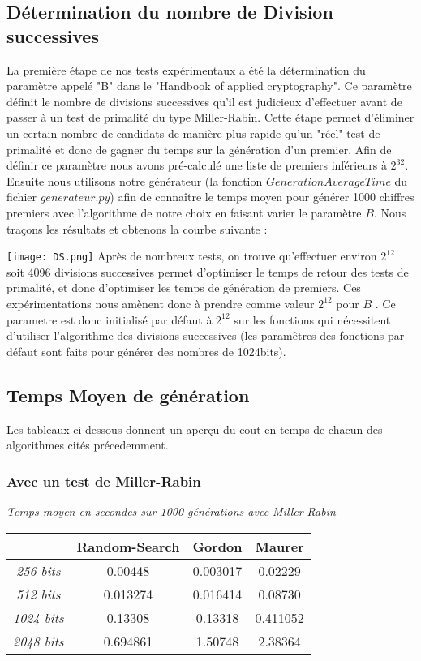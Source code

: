 \documentclass[a4paper,11pt]{article}
\begin{document}
\subsection{Détermination du nombre de Division successives}
La première étape de nos tests expérimentaux a été la détermination du paramètre appelé "B" dans le "Handbook of applied cryptography". Ce paramètre définit le nombre de divisions successives qu'il est judicieux d'effectuer avant de passer à un test de primalité du type Miller-Rabin. Cette étape permet d'éliminer un certain nombre de candidats de manière plus rapide qu'un "réel" test de primalité et donc de gagner du temps sur la génération d'un premier. 
\newline
Afin de définir ce paramètre nous avons pré-calculé une liste de premiers inférieurs à $2^{32}$. Ensuite nous utilisons notre  générateur (la fonction $GenerationAverageTime$ du fichier $generateur.py$) afin de connaître le temps moyen pour générer 1000 chiffres premiers avec l'algorithme de notre choix en  faisant varier le paramètre $B$. Nous traçons les résultats et obtenons la courbe suivante : 


{\centering
\texttt{[image: DS.png]}
}
Après de nombreux tests, on trouve qu'effectuer environ $2^{12}$ soit 4096 divisions successives permet d'optimiser le temps de retour des tests de primalité, et donc d'optimiser les temps de génération de premiers.
Ces expérimentations nous amènent donc à prendre comme valeur $2^{12}$ pour $B$ . Ce parametre est donc initialisé par défaut à $2^{12}$ sur les fonctions qui nécessitent d'utiliser l'algorithme des divisions successives (les paramêtres des fonctions par défaut sont faits pour générer des nombres de 1024bits).


\subsection{Temps Moyen de génération} 
Les tableaux ci dessous donnent un aperçu du cout en temps de chacun des algorithmes cités précedemment.

\subsubsection{ Avec un test de Miller-Rabin } 

\begin{center}
\emph{Temps moyen en secondes sur 1000 générations avec Miller-Rabin}
 \begin{tabular}{||c | c | c | c ||} 
 \hline
 \textbf{} & \textbf{Random-Search} & \textbf{Gordon} & \textbf{Maurer} \\ [0.5ex] 
 \hline\hline
 \emph{256 bits} & 0.00448 & 0.003017  & 0.02229 \\ 
 \hline
 \emph{512 bits} & 0.013274 & 0.016414  & 0.08730 \\
 \hline
 \emph{1024 bits}  & 0.13308 & 0.13318 & 0.411052 \\
 \hline
 \emph{2048 bits} & 0.694861 &  1.50748  & 2.38364 \\
 \hline
\end{tabular}
\end{center}
\end{document}
